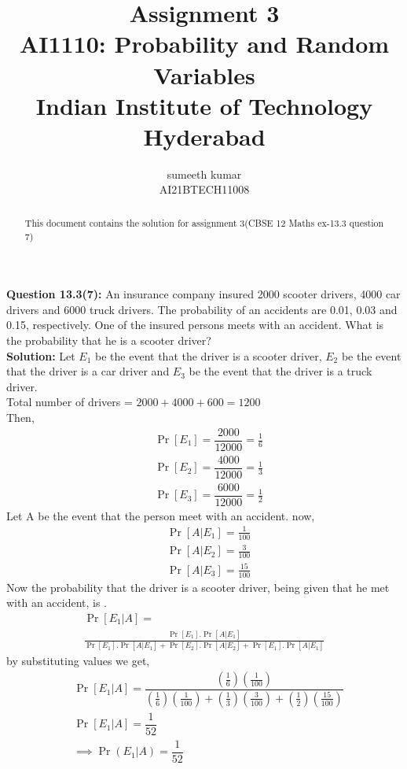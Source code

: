 \documentclass[journel,11pt,two column]{IEEEtran}
\title{Assignment 3 \\ \Large AI1110: Probability and Random Variables \\ \large Indian Institute of Technology Hyderabad}
\author{sumeeth kumar\\ \normalsize AI21BTECH11008 \\ }
\begin{document}
 \maketitle
 \begin{abstract}
     This document contains the solution for assignment 3(CBSE 12 Maths ex-13.3 question 7)
 \end{abstract}
 \textbf{Question 13.3(7):}
 An insurance company insured 2000 scooter drivers, 4000 car drivers and 6000 truck drivers. The probability of an accidents are 0.01, 0.03 and 0.15, respectively. One of the insured persons meets with an accident. What is the probability that he is a scooter driver?\\
 \textbf{Solution:}
 Let $ E_1$ be the event that the driver is a scooter driver, $E_2$ be the event that the driver is a car driver and $E_3$ be the event that the driver is a truck driver.\\
 Total number of drivers = $2000+4000+600=1200$\\
 Then,\\
 \begin{align}
  & { \Pr[E_1]=\dfrac{2000}{12000}=\frac{1}{6}}\\[8pt]
  &{\Pr[E_2]=\dfrac{4000}{12000}=\frac{1}{3}}\\[8pt]
  &{\Pr[E_3]=\dfrac{6000}{12000}=\frac{1}{2}}
  \end{align}
   Let A be the event that the person meet with an accident.
   now,\\
   \begin{align}
    &{ \Pr[A|E_1]=\frac{1}{100}}\\[8pt] 
    &{\Pr[A|E_2]=\frac{3}{100}}\\[8pt]
    &{\Pr[A|E_3]=\frac{15}{100}}
    \end{align}
    Now the probability that the driver is a scooter driver, being given that 
    he met with an accident, is \Pr[$E_1|A$].\\
 \begin{multline}
     \Pr[E_1|A]=\\\frac{\Pr[E_1].\Pr[A|E_1]}{\Pr[E_1].\Pr[A|E_1]+\Pr[E_2].\Pr[A|E_2]+\Pr[E_1].\Pr[A|E_1]}
  \end{multline}
  by substituting values we get,
  \begin{align}
  & { \Pr[E_1|A]= \dfrac{(\frac{1}{6})(\frac{1}{100})}{(\frac{1}{6})(\frac{1}{100})+(\frac{1}{3})(\frac{3}{100})+(\frac{1}{2})(\frac{15}{100})}}\\[8pt]
  &{ \Pr[E_1|A]= \dfrac{1}{52}}\\[8pt]
  &{\implies \Pr(E_1|A)=\dfrac{1}{52}}
  \end{align}
\end{document}
